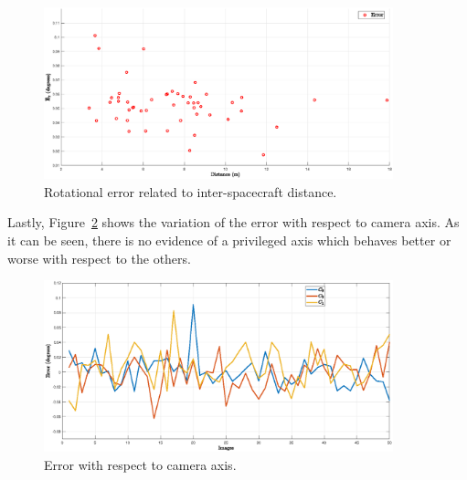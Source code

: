 \begin{figure}[htpb]
  \centering
  \includegraphics[width=0.9\textwidth]{gfx/plotError/rotAndDist.eps}
  \caption{Rotational error related to inter-spacecraft distance.}
  \label{fig:rotAndDist}
\end{figure}

Lastly, Figure~\ref{fig:c3c2c1} shows the variation of the error with respect to camera axis. As it can be seen, there is no evidence of a privileged axis which behaves better or worse with respect to the others.

\begin{figure}[htpb]
  \centering
  \includegraphics[width=0.9\textwidth]{gfx/plotError/c3c2c1.eps}
  \caption{Error with respect to camera axis.}
  \label{fig:c3c2c1}
\end{figure}
